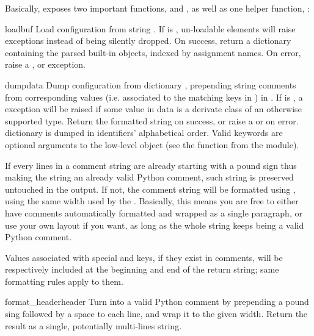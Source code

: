 \documentclass{howto}
\begin{document}
Basically,  exposes two important functions, 
and , as well as one helper function, :

\begin{funcdesc}{load}{buf}
Load configuration from string . If  is ,
un-loadable elements will raise  exceptions instead of
being silently dropped. On success, return a dictionary containing the parsed
built-in objects, indexed by assignment names. On error, raise a
,  or 
exception.
\end{funcdesc}

\begin{funcdesc}{dump}{data}
Dump configuration from dictionary , prepending string comments from
corresponding values (i.e. associated to the matching keys in ) in
. If  is , a 
exception will be raised if some value in data is a derivate class of an
otherwise supported type. Return the formatted string on success, or raise a
 or  on error.  dictionary
is dumped in identifiers' alphabetical order. Valid keywords are optional
arguments to the low-level  object (see the
 function from the  module).

If every lines in a comment string are already starting with a pound sign thus
making the string an already valid Python comment, such string is preserved
untouched in the output. If not, the comment string will be formatted using
, using the same width used by the
. Basically, this means you are free to either have
comments automatically formatted and wrapped as a single paragraph, or use your
own layout if you want, as long as the whole string keeps being a valid Python
comment.

Values associated with special  and  keys, if
they exist in comments, will be respectively included at the beginning and end
of the return string; same formatting rules apply to them.
\end{funcdesc}

\begin{funcdesc}{format_header}{header}
Turn  into a valid Python comment by prepending a pound sing
followed by a space to each line, and wrap it to the given width. Return the
result as a single, potentially multi-lines string.
\end{funcdesc}
\end{document}
